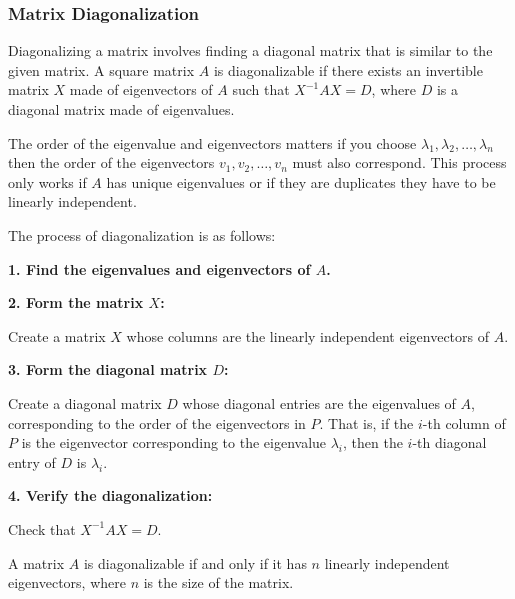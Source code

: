 \QED

\subsubsection{Matrix Diagonalization}

Diagonalizing a matrix involves finding a diagonal matrix that is similar to the given matrix. 
A square matrix \(A\) is diagonalizable if there exists an invertible matrix \(X\) made of eigenvectors of 
\(A\) such that \(X^{-1}AX = D\), where \(D\) is a diagonal matrix made of eigenvalues.
\vspace{\baselineskip}

The order of the eigenvalue and eigenvectors matters if you choose 
\(\lambda_1, \lambda_2, \dots, \lambda_n\) then the order of the eigenvectors 
\(v_1, v_2, \dots, v_n\) must also correspond. This process only works if \(A\) 
has unique eigenvalues or if they are duplicates they have to be linearly independent.
\vspace{\baselineskip}

The process of diagonalization is as follows:
\vspace{\baselineskip}

\textbf{1. Find the eigenvalues and eigenvectors of \(A\).}
\vspace{\baselineskip}

\textbf{2. Form the matrix \(X\):}

Create a matrix \(X\) whose columns are the linearly independent eigenvectors of \(A\).
\vspace{\baselineskip}

\textbf{3. Form the diagonal matrix \(D\):} 

Create a diagonal matrix \(D\) whose diagonal entries are the eigenvalues of \(A\), corresponding to 
the order of the eigenvectors in \(P\). That is, if the \(i\)-th column of \(P\) is the eigenvector 
corresponding to the eigenvalue \(\lambda_i\), then the \(i\)-th diagonal entry of \(D\) is \(\lambda_i\).
\vspace{\baselineskip}

\textbf{4. Verify the diagonalization:}
    
Check that \(X^{-1}AX = D\).
\vspace{\baselineskip}

A matrix \(A\) is diagonalizable if and only if it has \(n\) linearly independent eigenvectors, where 
\(n\) is the size of the matrix.
\vspace{\baselineskip}


